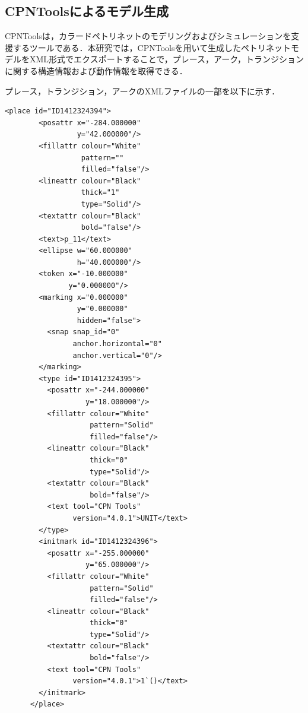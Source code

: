 \subsection{CPNToolsによるモデル生成}
CPNToolsは，カラードペトリネットのモデリングおよびシミュレーションを支援するツールである．本研究では，CPNToolsを用いて生成したペトリネットモデルをXML形式でエクスポートすることで，プレース，アーク，トランジションに関する構造情報および動作情報を取得できる．

プレース，トランジション，アークのXMLファイルの一部を以下に示す．

\begin{lstlisting}[caption=プレースのXMLファイル,label=cpn_place]
<place id="ID1412324394">
        <posattr x="-284.000000"
                 y="42.000000"/>
        <fillattr colour="White"
                  pattern=""
                  filled="false"/>
        <lineattr colour="Black"
                  thick="1"
                  type="Solid"/>
        <textattr colour="Black"
                  bold="false"/>
        <text>p_11</text>
        <ellipse w="60.000000"
                 h="40.000000"/>
        <token x="-10.000000"
               y="0.000000"/>
        <marking x="0.000000"
                 y="0.000000"
                 hidden="false">
          <snap snap_id="0"
                anchor.horizontal="0"
                anchor.vertical="0"/>
        </marking>
        <type id="ID1412324395">
          <posattr x="-244.000000"
                   y="18.000000"/>
          <fillattr colour="White"
                    pattern="Solid"
                    filled="false"/>
          <lineattr colour="Black"
                    thick="0"
                    type="Solid"/>
          <textattr colour="Black"
                    bold="false"/>
          <text tool="CPN Tools"
                version="4.0.1">UNIT</text>
        </type>
        <initmark id="ID1412324396">
          <posattr x="-255.000000"
                   y="65.000000"/>
          <fillattr colour="White"
                    pattern="Solid"
                    filled="false"/>
          <lineattr colour="Black"
                    thick="0"
                    type="Solid"/>
          <textattr colour="Black"
                    bold="false"/>
          <text tool="CPN Tools"
                version="4.0.1">1`()</text>
        </initmark>
      </place>
\end{lstlisting}

